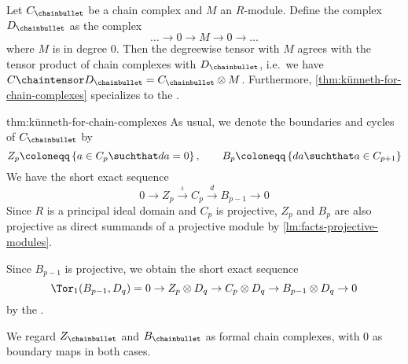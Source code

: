 \begin{remark}
  Let $C_\chainbullet $ be a chain complex and $M$ an $R$-module. 
  Define the complex $D_\chainbullet $ as the complex
  \[
    \ldots \to  0 \to  M \to  0 \to  \ldots
  \]
  where $M$ is in degree $0$.
  Then the degreewise tensor with $M$ agrees
  with the tensor product of chain complexes with $D_\chainbullet $,
  i.e.~we have $C\chaintensor  D_\chainbullet  = C_\chainbullet \tensor M$.
  Furthermore, \autoref{thm:künneth-for-chain-complexes} specializes
  to the .
\end{remark}

\begin{refproof}{thm:künneth-for-chain-complexes}
  As usual, we denote the boundaries and cycles of $C_\chainbullet $ by
  \[
    Z_p \coloneqq \set{ a\in C_p \suchthat da = 0 },
    \qquad
    B_p \coloneqq \set{ da \suchthat  a \in C_{p+1} } 
  \]
  We have the short exact sequence
  \begin{equation}
    \label{eq:künneth-ses-cycles-boundaries}
    0 \to  Z_p \xrightarrow{ι}   C_p \xrightarrow{d}  B_{p-1} \to 0
  \end{equation}
  Since $R$ is a  principal ideal domain and $C_p$ is projective,
  $Z_p$ and  $B_p$ are also projective as direct summands
  of a projective module by
  \autoref{lm:facts-projective-modules}.

  Since $B_{p-1}$ is projective, we obtain the
  short exact sequence
  \[
    \Tor_1(B_{p-1}, D_q) = 0
    \to Z_p \tensor D_q
    \to C_p \tensor D_q
    \to B_{p-1} \tensor D_q
    \to 0
  \]
  by the .

  We regard $Z_\chainbullet $ and $B_\chainbullet $ as formal
  chain complexes, with $0$ as boundary maps in both cases.


\end{refproof}
